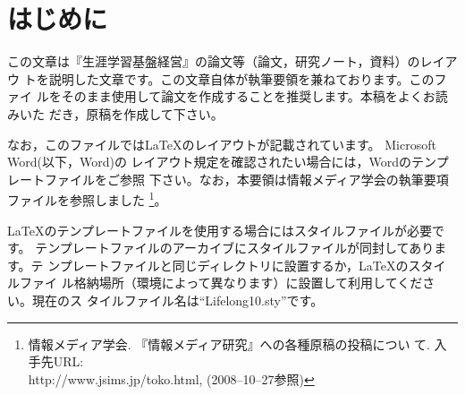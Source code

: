 \documentclass[b5paper,10pt,twocolumn,tombow]{jarticle}
\begin{document}
\tableofcontents{}
\bigskip{}
\section{はじめに}
この文章は『生涯学習基盤経営』の論文等（論文，研究ノート，資料）のレイアウ
トを説明した文章です。この文章自体が執筆要領を兼ねております。このファイ
ルをそのまま使用して論文を作成することを推奨します。本稿をよくお読みいた
だき，原稿を作成して下さい。


なお，このファイルでは\LaTeX{}のレイアウトが記載されています。
Microsoft Word(以下，Word)の
レイアウト規定を確認されたい場合には，Wordのテンプレートファイルをご参照
下さい。なお，本要領は情報メディア学会の執筆要項ファイルを参照しました
\footnote{情報メディア学会. 『情報メディア研究』への各種原稿の投稿につい
て. 入手先URL:\\ http://www.jsims.jp/toko.html, (2008--10--27参照)}。

\LaTeX{}のテンプレートファイルを使用する場合にはスタイルファイルが必要です。
テンプレートファイルのアーカイブにスタイルファイルが同封してあります。テ
ンプレートファイルと同じディレクトリに設置するか，\LaTeX{}のスタイルファイ
ル格納場所（環境によって異なります）に設置して利用してください。現在のス
タイルファイル名は``Lifelong10.sty''です。
\end{document}
